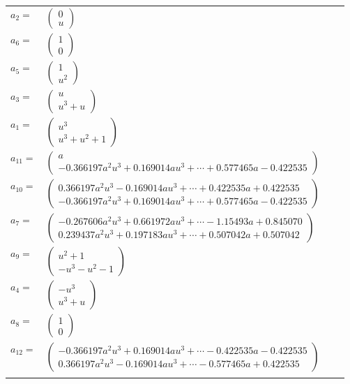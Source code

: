\documentclass[1p]{elsarticle_modified}
\theoremstyle{definition}
\begin{document}
\begin{tabular}{m{7pt} m{180pt} m{7pt} m{180pt} }
\flushright $a_{2}=$&$\begin{pmatrix}0\\u\end{pmatrix}$ \\
\flushright $a_{6}=$&$\begin{pmatrix}1\\0\end{pmatrix}$ \\
\flushright $a_{5}=$&$\begin{pmatrix}1\\u^2\end{pmatrix}$ \\
\flushright $a_{3}=$&$\begin{pmatrix}u\\u^3+u\end{pmatrix}$ \\
\flushright $a_{1}=$&$\begin{pmatrix}u^3\\u^3+u^2+1\end{pmatrix}$ \\
\flushright $a_{11}=$&$\begin{pmatrix}a\\-0.366197 a^{2} u^{3}+0.169014 a u^{3}+\cdots+0.577465 a-0.422535\end{pmatrix}$ \\
\flushright $a_{10}=$&$\begin{pmatrix}0.366197 a^{2} u^{3}-0.169014 a u^{3}+\cdots+0.422535 a+0.422535\\-0.366197 a^{2} u^{3}+0.169014 a u^{3}+\cdots+0.577465 a-0.422535\end{pmatrix}$ \\
\flushright $a_{7}=$&$\begin{pmatrix}-0.267606 a^{2} u^{3}+0.661972 a u^{3}+\cdots-1.15493 a+0.845070\\0.239437 a^{2} u^{3}+0.197183 a u^{3}+\cdots+0.507042 a+0.507042\end{pmatrix}$ \\
\flushright $a_{9}=$&$\begin{pmatrix}u^2+1\\- u^3- u^2-1\end{pmatrix}$ \\
\flushright $a_{4}=$&$\begin{pmatrix}- u^3\\u^3+u\end{pmatrix}$ \\
\flushright $a_{8}=$&$\begin{pmatrix}1\\0\end{pmatrix}$ \\
\flushright $a_{12}=$&$\begin{pmatrix}-0.366197 a^{2} u^{3}+0.169014 a u^{3}+\cdots-0.422535 a-0.422535\\0.366197 a^{2} u^{3}-0.169014 a u^{3}+\cdots-0.577465 a+0.422535\end{pmatrix}$\\&\end{tabular}
\end{document}
